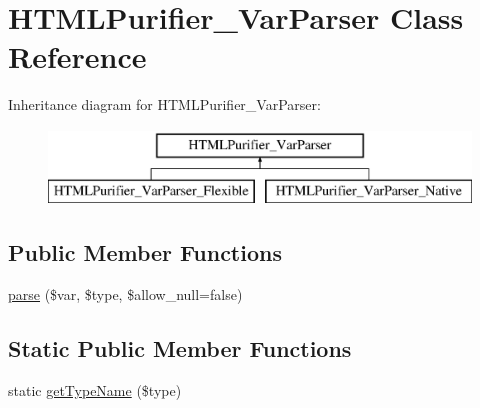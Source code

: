 \hypertarget{classHTMLPurifier__VarParser}{\section{H\+T\+M\+L\+Purifier\+\_\+\+Var\+Parser Class Reference}
\label{classHTMLPurifier__VarParser}
}
Inheritance diagram for H\+T\+M\+L\+Purifier\+\_\+\+Var\+Parser\+:\begin{figure}[H]
\begin{center}
\leavevmode
\includegraphics[height=2.000000cm]{classHTMLPurifier__VarParser}
\end{center}
\end{figure}
\subsection*{Public Member Functions}
\begin{DoxyCompactItemize}
\item 
\hyperlink{classHTMLPurifier__VarParser_ad815e8ced3c5d89c2afe7a20ec989399}{parse} (\$var, \$type, \$allow\+\_\+null=false)
\end{DoxyCompactItemize}
\subsection*{Static Public Member Functions}
\begin{DoxyCompactItemize}
\item 
static \hyperlink{classHTMLPurifier__VarParser_aa4f5d921185452efefb845e166a8f559}{get\+Type\+Name} (\$type)
\end{DoxyCompactItemize}
